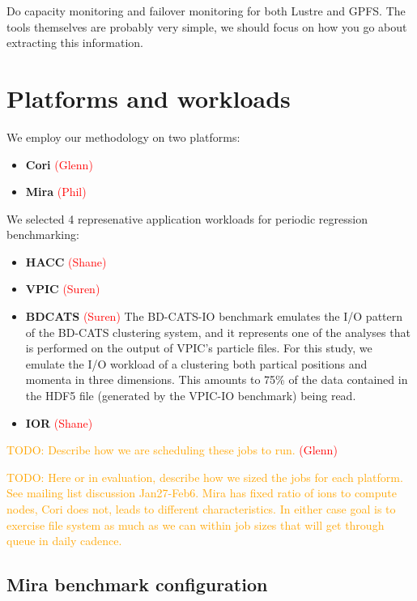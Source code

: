 \documentclass[conference,10pt,compsocconf]{IEEEtran}
\newcommand{\assign}[1]{\textcolor{red}{(#1)}}
\newcommand{\todo}[1]{\textcolor{Orange}{TODO: #1}}
\begin{document}
Do capacity monitoring and failover monitoring for both Lustre and GPFS.  The
tools themselves are probably very simple, we should focus on how you go
about extracting this information.

\section{Platforms and workloads}

We employ our methodology on two platforms:

\begin{itemize}
\item \textbf{Cori} \assign{Glenn}
\item \textbf{Mira} \assign{Phil}
\end{itemize}

We selected 4 represenative application workloads for periodic regression
benchmarking:

\begin{itemize}
\item \textbf{HACC} \assign{Shane}
\item \textbf{VPIC} \assign{Suren} \cite{Bowers2008}
\item \textbf{BDCATS} \assign{Suren} The BD-CATS-IO benchmark emulates the I/O
pattern of the BD-CATS clustering system\cite{Patwary2015}, and it represents
one of the analyses that is performed on the output of VPIC's particle files.
For this study, we emulate the I/O workload of a clustering both partical
positions and momenta in three dimensions.  This amounts to 75\% of the data
contained in the HDF5 file (generated by the VPIC-IO benchmark) being read.
\item \textbf{IOR} \assign{Shane}
\end{itemize}

\todo{Describe how we are scheduling these jobs to run.} \assign{Glenn}

\todo{Here or in evaluation, describe how we sized the jobs for each
platform.  See mailing list discussion Jan27-Feb6.  Mira has fixed ratio of
ions to compute nodes, Cori does not, leads to different characteristics.  In
either case goal is to exercise file system as much as we can within job
sizes that will get through queue in daily cadence.}

\subsection{Mira benchmark configuration}
\end{document}

